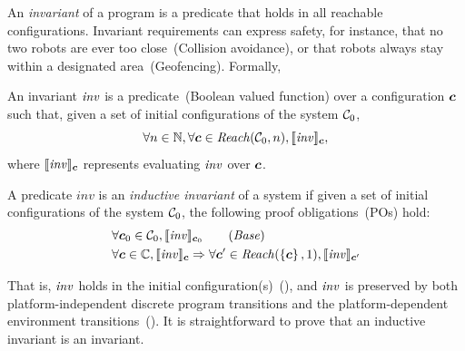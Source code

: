 An \emph{invariant} of a \lgname program is a predicate that holds in all reachable  configurations.
Invariant requirements can express safety, for instance, that no two robots are ever too close~(Collision avoidance),
or that robots always stay within a designated area~(Geofencing).
Formally,
\begin{definition}
An invariant $\mathit{inv}$ is a predicate~(Boolean valued function) over a configuration $\mathit{\boldsymbol{c}}$ such that,
given a set of initial configurations of the system $\mathcal{C}_0$,
\[
\forall n\in\naturals, \forall\gconfig \in \Reach(\gset_0, n), \eec{\Inv}{\gconfig},
\]
where $\llbracket\mathit{inv}\rrbracket_{\mathit{\boldsymbol{c}}}$ represents evaluating $\mathit{inv}$ over $\mathit{\boldsymbol{c}}$.
\end{definition}
%
%


\begin{definition}
\label{def:ii}
A predicate $\mathit{inv}$ is an \emph{inductive invariant} of a system if given a set of initial configurations of the system $\mathcal{C}_0$, the following proof obligations~(POs) hold:
\begin{align}
&\forall \gconfig_0\in \gset_0, \eec{\Inv}{\gconfig_0} \label{po:base}\tag{\textit{Base}}\\
&\forall \gconfig \in \pwg, \eec{\Inv}{\gconfig} \Rightarrow \forall \gconfig' \in \Reach(\left\{\gconfig\right\},1), \eec{\Inv}{\gconfig'} \label{po:ind-hyp-orig}
\end{align}
\end{definition}
\noindent
That is, $\mathit{inv}$ holds in the initial configuration(s)~(),
and $\mathit{inv}$ is preserved by both platform-independent discrete program transitions and the platform-dependent environment transitions~().
It is straightforward to prove that an inductive invariant is  an invariant.

